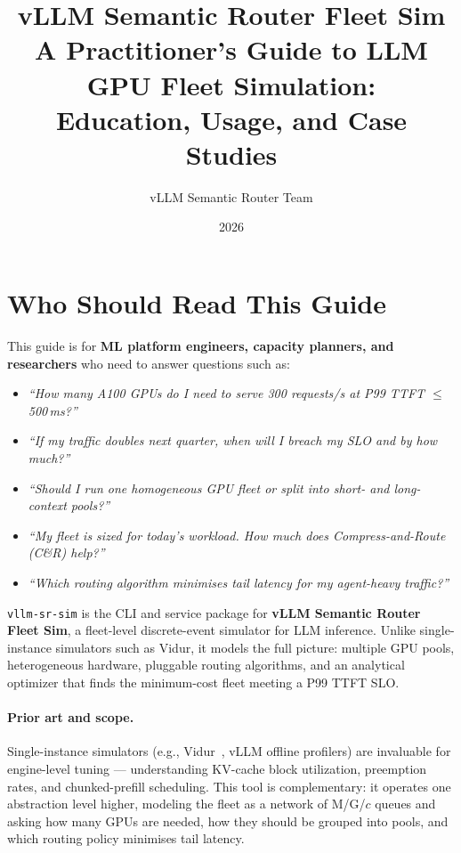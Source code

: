 \documentclass[11pt,a4paper]{article}
\title{%
  \textbf{vLLM Semantic Router Fleet Sim}\\[4pt]
  \large A Practitioner's Guide to LLM GPU Fleet Simulation:\\
  Education, Usage, and Case Studies%
}
\author{vLLM Semantic Router Team}
\date{2026}
\begin{document}
\maketitle
\tableofcontents
\newpage

\section{Who Should Read This Guide}
\label{sec:intro}

This guide is for \textbf{ML platform engineers, capacity planners, and
researchers} who need to answer questions such as:

\begin{itemize}[nosep]
  \item \textit{``How many A100 GPUs do I need to serve 300 requests/s
    at P99 TTFT $\leq$ 500\,ms?''}
  \item \textit{``If my traffic doubles next quarter, when will I
    breach my SLO and by how much?''}
  \item \textit{``Should I run one homogeneous GPU fleet or split into
    short- and long-context pools?''}
  \item \textit{``My fleet is sized for today's workload. How much
    does Compress-and-Route (C\&R) help?''}
  \item \textit{``Which routing algorithm minimises tail latency for
    my agent-heavy traffic?''}
\end{itemize}

\texttt{vllm-sr-sim} is the CLI and service package for
\textbf{vLLM Semantic Router Fleet Sim}, a fleet-level discrete-event
simulator for LLM inference. Unlike single-instance simulators such as
Vidur, it models the full picture: multiple GPU pools, heterogeneous
hardware, pluggable routing algorithms, and an analytical optimizer that
finds the minimum-cost fleet meeting a P99 TTFT SLO.

\paragraph{Prior art and scope.}
Single-instance simulators (e.g., Vidur~\citep{vidur2024},
vLLM offline profilers) are invaluable for engine-level tuning ---
understanding KV-cache block utilization, preemption rates, and
chunked-prefill scheduling.  This tool is complementary: it operates
one abstraction level higher, modeling the fleet as a network of M/G/$c$
queues and asking how many GPUs are needed, how they should be grouped
into pools, and which routing policy minimises tail latency.
\end{document}
